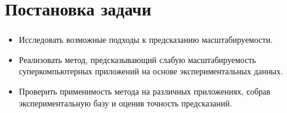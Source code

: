 \documentclass[unicode, t, 11pt]{beamer}%
\begin{document}
	\section{Постановка задачи}
		\begin{frame}
			\frametitle{\insertsection}
			\begin{itemize}[label=\(\bullet\)]
				\item Исследовать возможные подходы к предсказанию масштабируемости.
				\item Реализовать метод, предсказывающий слабую масштабируемость суперкомпьютерных приложений на основе экспериментальных данных.
				\item Проверить применимость метода на различных приложениях, собрав экспериментальную базу и оценив точность предсказаний.
			\end{itemize}
		\end{frame}
\end{document}
